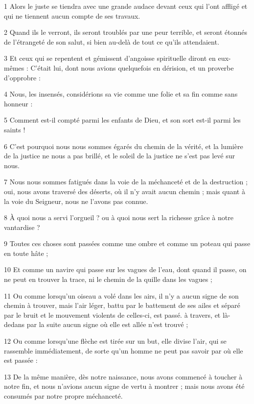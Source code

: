 \par 1 Alors le juste se tiendra avec une grande audace devant ceux qui l'ont affligé et qui ne tiennent aucun compte de ses travaux.
\par 2 Quand ils le verront, ils seront troublés par une peur terrible, et seront étonnés de l'étrangeté de son salut, si bien au-delà de tout ce qu'ils attendaient.
\par 3 Et ceux qui se repentent et gémissent d'angoisse spirituelle diront en eux-mêmes : C'était lui, dont nous avions quelquefois en dérision, et un proverbe d'opprobre :
\par 4 Nous, les insensés, considérions sa vie comme une folie et sa fin comme sans honneur :
\par 5 Comment est-il compté parmi les enfants de Dieu, et son sort est-il parmi les saints !
\par 6 C'est pourquoi nous nous sommes égarés du chemin de la vérité, et la lumière de la justice ne nous a pas brillé, et le soleil de la justice ne s'est pas levé sur nous.
\par 7 Nous nous sommes fatigués dans la voie de la méchanceté et de la destruction ; oui, nous avons traversé des déserts, où il n'y avait aucun chemin ; mais quant à la voie du Seigneur, nous ne l'avons pas connue.
\par 8 À quoi nous a servi l'orgueil ? ou à quoi nous sert la richesse grâce à notre vantardise ?
\par 9 Toutes ces choses sont passées comme une ombre et comme un poteau qui passe en toute hâte ;
\par 10 Et comme un navire qui passe sur les vagues de l'eau, dont quand il passe, on ne peut en trouver la trace, ni le chemin de la quille dans les vagues ;
\par 11 Ou comme lorsqu'un oiseau a volé dans les airs, il n'y a aucun signe de son chemin à trouver, mais l'air léger, battu par le battement de ses ailes et séparé par le bruit et le mouvement violents de celles-ci, est passé. à travers, et là-dedans par la suite aucun signe où elle est allée n'est trouvé ;
\par 12 Ou comme lorsqu'une flèche est tirée sur un but, elle divise l'air, qui se rassemble immédiatement, de sorte qu'un homme ne peut pas savoir par où elle est passée :
\par 13 De la même manière, dès notre naissance, nous avons commencé à toucher à notre fin, et nous n'avions aucun signe de vertu à montrer ; mais nous avons été consumés par notre propre méchanceté.
